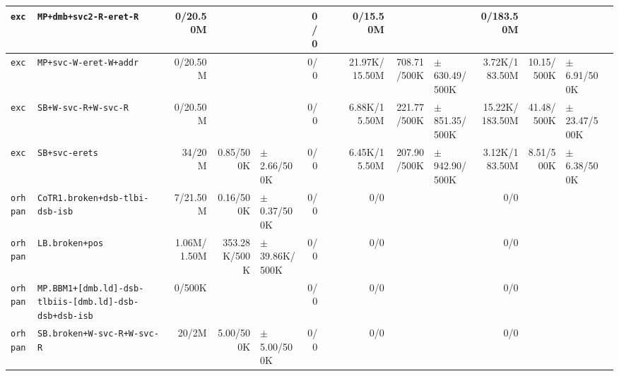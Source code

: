 \begin{tabular}{l l  | r r l | r r l | r r l | r r l l}
            \verb|exc| &                                 \verb|MP+dmb+svc2-R-eret-R| &       0/20.50M &                       &                   &            0/0 &                       &  &       0/15.50M &                       &                   &      0/183.50M &                       &                    & \\ \hline 
            \verb|exc| &                                 \verb|MP+svc-W-eret-W+addr| &       0/20.50M &                       &                   &            0/0 &                       &  &  21.97K/15.50M &           708.71/500K & $\pm$ 630.49/500K &  3.72K/183.50M &            10.15/500K &    $\pm$ 6.91/500K & \\ \hline 
            \verb|exc| &                                   \verb|SB+W-svc-R+W-svc-R| &       0/20.50M &                       &                   &            0/0 &                       &  &   6.88K/15.50M &           221.77/500K & $\pm$ 851.35/500K & 15.22K/183.50M &            41.48/500K &   $\pm$ 23.47/500K & \\ \hline 
            \verb|exc| &                                         \verb|SB+svc-erets| &         34/20M &             0.85/500K &   $\pm$ 2.66/500K &            0/0 &                       &  &   6.45K/15.50M &           207.90/500K & $\pm$ 942.90/500K &  3.12K/183.50M &             8.51/500K &    $\pm$ 6.38/500K & \\ \hline 
         \verb|orhpan| &                        \verb|CoTR1.broken+dsb-tlbi-dsb-isb| &       7/21.50M &             0.16/500K &   $\pm$ 0.37/500K &            0/0 &                       &  &            0/0 &                       &                   &            0/0 &                       &                    & \\ \hline 
         \verb|orhpan| &                                        \verb|LB.broken+pos| &    1.06M/1.50M &          353.28K/500K & $\pm$ 39.86K/500K &            0/0 &                       &  &            0/0 &                       &                   &            0/0 &                       &                    & \\ \hline 
         \verb|orhpan| & \verb|MP.BBM1+[dmb.ld]-dsb-tlbiis-[dmb.ld]-dsb-dsb+dsb-isb| &         0/500K &                       &                   &            0/0 &                       &  &            0/0 &                       &                   &            0/0 &                       &                    & \\ \hline 
         \verb|orhpan| &                            \verb|SB.broken+W-svc-R+W-svc-R| &          20/2M &             5.00/500K &   $\pm$ 5.00/500K &            0/0 &                       &  &            0/0 &                       &                   &            0/0 &                       &                    & \\ \hline 

\end{tabular}
